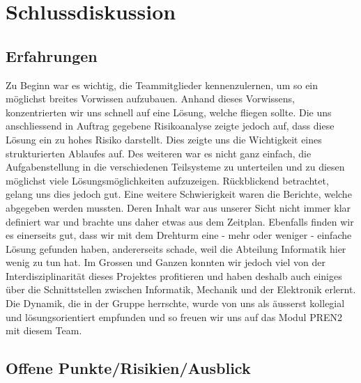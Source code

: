 \section{Schlussdiskussion}

\subsection{Erfahrungen}

Zu Beginn war es wichtig, die Teammitglieder kennenzulernen, um so ein 
möglichst breites Vorwissen aufzubauen. Anhand dieses Vorwissens, 
konzentrierten wir uns schnell auf eine Lösung, welche fliegen sollte. Die uns 
anschliessend in Auftrag gegebene Risikoanalyse zeigte jedoch auf, dass diese 
Lösung ein zu hohes Risiko darstellt. Dies zeigte uns die 
Wichtigkeit eines strukturierten Ablaufes auf. Des weiteren war es nicht ganz 
einfach, die Aufgabenstellung in die verschiedenen Teilsysteme zu unterteilen  
und zu diesen möglichst viele Lösungsmöglichkeiten aufzuzeigen. 
Rückblickend betrachtet, gelang uns dies jedoch gut. Eine weitere 
Schwierigkeit waren die Berichte, welche abgegeben werden mussten. 
Deren Inhalt war aus unserer Sicht nicht immer klar definiert war und brachte uns daher 
etwas aus dem Zeitplan.
Ebenfalls finden wir es einerseits gut, dass wir mit dem Drehturm eine - mehr oder weniger - einfache Lösung gefunden haben, andererseits schade, weil die Abteilung Informatik hier wenig zu tun hat. Im Grossen und Ganzen konnten wir jedoch viel 
von der Interdisziplinarität dieses Projektes profitieren und haben deshalb 
auch einiges über die Schnittstellen zwischen Informatik, Mechanik und der Elektronik 
erlernt. Die Dynamik, die in der Gruppe herrschte, wurde von uns als äusserst kollegial und lösungsorientiert empfunden und so freuen wir uns auf das Modul PREN2 mit diesem Team.


\subsection{Offene Punkte/Risikien/Ausblick}
